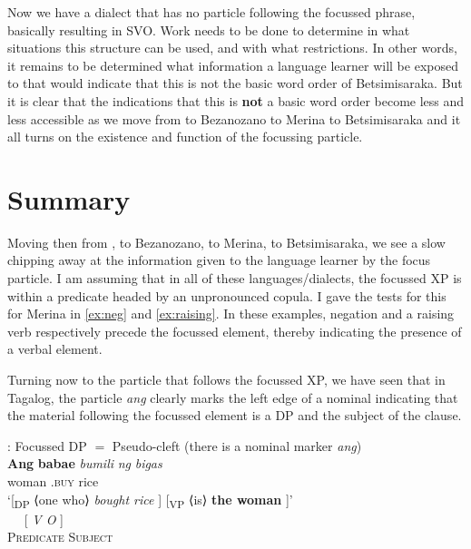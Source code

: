\documentclass[output=paper]{langsci/langscibook}
\begin{document}
Now we have a dialect that has no particle following the focussed phrase,
basically resulting in SVO.  Work needs to be done to determine in what
situations this structure can be used, and with what restrictions.  In other
words, it remains to be determined what information a language learner will be
exposed to that would indicate that this is not the basic word order of
Betsimisaraka.  But it is clear that the indications that this is \textbf{not}
a basic word order become less and less accessible as we move from  to
Bezanozano to Merina to Betsimisaraka and it all turns on the existence and
function of the focussing particle.

\section{Summary}

Moving then from , to Bezanozano, to Merina, to Betsimisaraka, we
see a slow chipping away at the information given to the language learner by
the focus particle.  I am assuming that in all of these languages/dialects, the
focussed XP is within a predicate headed by an unpronounced copula. I gave the
tests for this for Merina in \eqref{ex:neg} and \eqref{ex:raising}. In these
examples, negation and a raising verb respectively precede the focussed
element, thereby indicating the presence of a verbal element.

Turning now to the particle that follows the focussed XP, we have seen that in
Tagalog, the particle \emph{ang} clearly marks the left edge of a nominal
indicating that the material following the focussed element is a DP and the
subject of the clause.\largerpage[-1]

\ea  {}: Focussed DP $=$ Pseudo-cleft (there is a  nominal marker \emph{ang})\\
    \ea
    \gll  \textbf{Ang} \textbf{babae}  \emph{bumili} \emph{ng} \emph{bigas}\\
    \Nom{} woman \Nom{} \At.\textsc{buy} \Acc{} rice\\
    \glt `[\textsubscript{DP}  ⟨one who⟩ \emph{bought rice} ] [\textsubscript{VP} ⟨is⟩ \textbf{the woman} ]' \\
    \ex
     {~~} {[  \emph{V O} ]}\\
         \textsc{Predicate} {} \textsc{Subject}\\
    \z
\z
\end{document}
